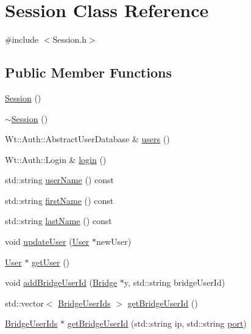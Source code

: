 \hypertarget{class_session}{}\section{Session Class Reference}
\label{class_session}


{\ttfamily \#include $<$Session.\+h$>$}

\subsection*{Public Member Functions}
\begin{DoxyCompactItemize}
\item 
\hyperlink{class_session_ad92ef09b872c9227e38a6efdd4d8a837}{Session} ()
\item 
\hyperlink{class_session_a8753bb9dee966b7d39abc9b7237cd665}{$\sim$\+Session} ()
\item 
Wt\+::\+Auth\+::\+Abstract\+User\+Database \& \hyperlink{class_session_af91c8b22a14acf05e46265698deb8af4}{users} ()
\item 
Wt\+::\+Auth\+::\+Login \& \hyperlink{class_session_ac9b69619756936d8f27bc6702c334b1f}{login} ()
\item 
std\+::string \hyperlink{class_session_a7d11b256732932890d327a477585a85f}{user\+Name} () const
\item 
std\+::string \hyperlink{class_session_a649a79834856c8584935f06ea572ed62}{first\+Name} () const
\item 
std\+::string \hyperlink{class_session_acea6101a22c15bb77c7f30235088fb85}{last\+Name} () const
\item 
void \hyperlink{class_session_a646f3f09d40303c6539c7bbacb93893e}{update\+User} (\hyperlink{class_user}{User} $\ast$new\+User)
\item 
\hyperlink{class_user}{User} $\ast$ \hyperlink{class_session_aa01be017bbea5350214c2ddff5512073}{get\+User} ()
\item 
void \hyperlink{class_session_aeaa52fe80f71a9c299a7fe10a1568568}{add\+Bridge\+User\+Id} (\hyperlink{class_bridge}{Bridge} $\ast$y, std\+::string bridge\+User\+Id)
\item 
std\+::vector$<$ \hyperlink{class_bridge_user_ids}{Bridge\+User\+Ids} $>$ \hyperlink{class_session_a6f9e5ceea5b79487e7c9fdbd9f7b2491}{get\+Bridge\+User\+Id} ()
\item 
\hyperlink{class_bridge_user_ids}{Bridge\+User\+Ids} $\ast$ \hyperlink{class_session_a23fa8d97108b7a713ca7dcf9808cccbe}{get\+Bridge\+User\+Id} (std\+::string ip, std\+::string \hyperlink{_bridge_control_8_c_ae969f7204a7e846b98a88497dd85f672}{port})

\end{DoxyCompactItemize}
